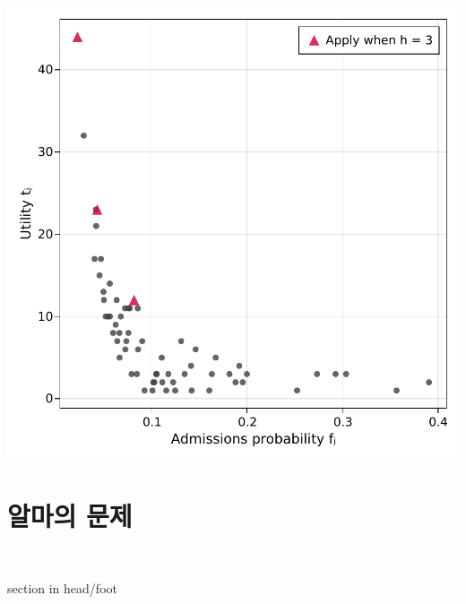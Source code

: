 \documentclass[10pt,slidestop,compress,mathserif,notheorems]{beamer}
\newif\ifen
\theoremstyle{definition}
\theoremstyle{definition}
\begin{document}
\begin{frame}[plain]{}
\begin{center}
\includegraphics[height=\textheight]{plots/samplemarket-soln.pdf}
\end{center}
\end{frame}








\ifen \section{Alma's problem} \else \section{알마의 문제} \fi

\ifen{
\begin{frame}[plain]
  \vspace{9em}
\begin{center}
~
\begin{beamercolorbox}[wd=.6\textwidth,sep=8pt,center,shadow=false,rounded=true]{section in head/foot}
    \usebeamerfont{title} \insertsectionhead \par%
  \end{beamercolorbox}
~
\end{center}
\end{frame}
}
\else{
\begin{frame}
  \vspace{9em}
\begin{center}
~
\begin{beamercolorbox}[wd=.6\textwidth,sep=8pt,center,shadow=false,rounded=true]{section in head/foot}
     \insertsectionhead \par%
  \end{beamercolorbox}
~
\end{center}
\end{frame}
}
\fi
\end{document}
